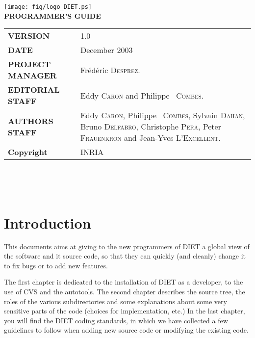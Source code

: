 \documentclass[11pt,a4paper]{report}
\begin{document}

\thispagestyle{empty}
\vspace*{3cm}
\vspace*{3cm}

\begin{center}
\texttt{[image: fig/logo\_DIET.ps]}\\[2ex]
\textbf{\Huge PROGRAMMER'S GUIDE\\[2ex]}
\end{center}

\vfill


\noindent
\small{
\begin{tabular}{ll}
  \textbf{VERSION}  & 1.0\\
  \textbf{DATE}     & December 2003\\
  \textbf{PROJECT MANAGER}  & Fr\'ed\'eric \textsc{Desprez}.\\
  \textbf{EDITORIAL STAFF}  & Eddy \textsc{Caron} and Philippe ~\textsc{Combes}.\\
  \textbf{AUTHORS STAFF}    & 
\begin{minipage}[t]{12cm}
  Eddy \textsc{Caron}, Philippe ~\textsc{Combes}, Sylvain \textsc{Dahan}, Bruno \textsc{Delfabro}, Christophe \textsc{Pera}, Peter \textsc{Frauenkron} and Jean-Yves \textsc{L'Excellent}.
\end{minipage} \\
  \textbf{Copyright}& INRIA
\end{tabular}\\
}

\newpage
\thispagestyle{empty}
\ 


\newpage
\tableofcontents


\sloppy

%
%
\newpage
{}
\chapter*{Introduction}

This documents aims at giving to the new programmers of DIET a global
view of the software and it source code, so that they can quickly (and
cleanly) change it to fix bugs or to add new features.

The first chapter is dedicated to the installation of DIET as a
developer, to the use of CVS and the autotools.  The second chapter
describes the source tree, the roles of the various subdirectories and
some explanations about some very sensitive parts of the code (choices
for implementation, etc.)  In the last chapter, you will find the DIET
coding standards, in which we have collected a few guidelines to
follow when adding new source code or modifying the existing code.
\end{document}
